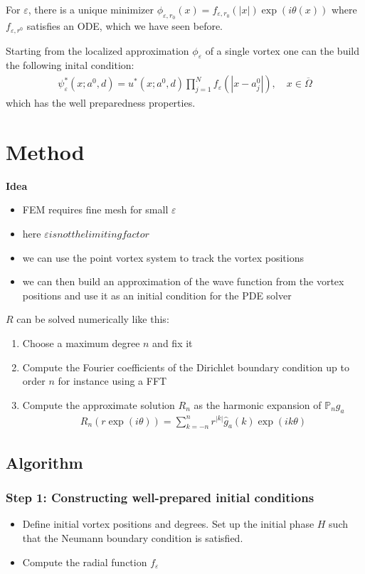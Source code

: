 \documentclass[12pt, a4paper]{article}
\theoremstyle{plain}
\theoremstyle{definition}
\newcommand{\psieps}{\psi_\varepsilon}
\begin{document}
For $\varepsilon$, there is a unique minimizer
$\phi_{\varepsilon, r_0} (x) = f_{\varepsilon, r_0} (|x|) \exp (i \theta(x))$
where $f_{\varepsilon, r^0}$ satisfies an ODE, which we have seen before. 

Starting from the localized approximation $\phi_\varepsilon$ of a single vortex one can the build the following inital condition:
\begin{align}
    \psieps^* (x; a^0, d) = u^* (x; a^0, d) \prod^N_{j=1} f_\varepsilon (|x- a^0_j|), \quad x \in \overline \Omega
\end{align}
which has the well preparedness properties.

\section{Method}
\textbf{Idea}
\begin{itemize}
    \item FEM requires fine mesh for small $\varepsilon$
    \item here $\varepsilon is not the limiting factor$
    \item we can use the point vortex system to track the vortex positions
    \item we can then build an approximation of the wave function from the vortex positions and use
    it as an initial condition for the PDE solver
\end{itemize}
$R$ can be solved numerically like this:
\begin{enumerate}
\item Choose a maximum degree $n$ and fix it
\item Compute the Fourier coefficients of the Dirichlet boundary condition up to order $n$ for instance using a FFT
\item Compute the approximate solution $R_n$ as the harmonic expansion of $\mathbb{P}_n g_a$
\begin{align}
    R_n (r \exp (i \theta)) = \sum^n_{k=-n} r^{|k|} \hat g_a (k) \exp (i k \theta)
\end{align}
\end{enumerate}

\subsection{Algorithm}

\subsubsection{Step 1: Constructing well-prepared initial conditions}
\begin{itemize}
\item Define initial vortex positions and degrees. Set up the initial phase $H$ such that the Neumann boundary condition is satisfied.
\item Compute the radial function $f_\varepsilon$
\end{itemize}
\end{document}
